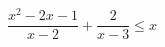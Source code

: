 \begin{ex}[type=inequality]
	\begin{condition}
		\( \dfrac{x^2-2x-1}{x-2}+\dfrac{2}{x-3}\le x \)
	\end{condition}
	\answer{\( (-\infty;1]\cup(2;3) \)}
\end{ex}